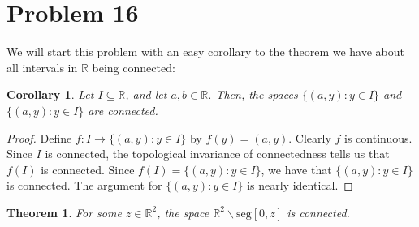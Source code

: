 \documentclass[10pt,a4paper]{article}
\author{Jeremiah Givens}
\theoremstyle{theorem}
\newtheorem{theorem}{Theorem}
\newtheorem{corollary}{Corollary}
\theoremstyle{definition}
\begin{document}
\section*{Problem 16}
We will start this problem with an easy corollary to the theorem we have about all intervals in $\mathbb{R}$ being connected:
\begin{corollary}
Let $I \subseteq \mathbb{R}$, and let $a, b \in \mathbb{R}$. Then, the spaces $\{(a,  y): y \in I\}$ and $\{(a,  y): y \in I\}$ are connected.
\end{corollary}

\begin{proof}
Define $f:I \to \{(a,  y): y \in I\}$ by $f(y) = (a,  y)$. Clearly $f$ is continuous. Since $I$ is connected, the topological invariance of connectedness tells us that $f(I)$ is connected. Since $f(I) = \{(a,  y): y \in I\}$, we have that $\{(a,  y): y \in I\}$ is connected. The argument for $\{(a,  y): y \in I\}$ is nearly identical.
\end{proof}

\begin{theorem}
For some $z \in \mathbb{R}^2$,  the space $\mathbb{R}^2 \backslash \text{seg}[0, z]$ is connected.
\end{theorem}
\end{document}
